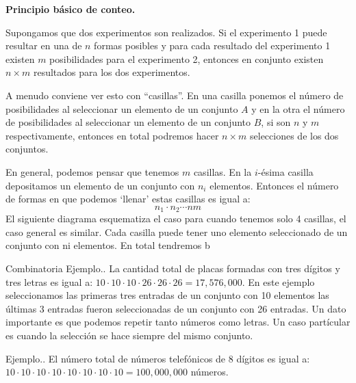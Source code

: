 \documentclass[14pt]{extreport}
\newcounter{ejemplo}[chapter]
\begin{document}
\textbf{Principio básico de conteo.}

Supongamos que dos experimentos son realizados. Si el experimento 1 puede resultar en una de $n$ formas posibles y para cada resultado del experimento 1 existen $m$ posibilidades para el experimento 2, entonces en conjunto existen $n\times m$ resultados para los dos experimentos.


A menudo conviene ver esto con ``casillas''. En una casilla ponemos el número de posibilidades al seleccionar un elemento de un conjunto $A$ y en la otra el número de posibilidades al seleccionar un elemento de un conjunto $B$, si son $n$ y $m$ respectivamente, entonces en total podremos hacer $n\times m$ selecciones de los dos conjuntos.

\begin{center}

\end{center}

En general, podemos pensar que tenemos $m$ casillas. En la $i$-ésima casilla depositamos un elemento de un conjunto con $n_i$ elementos. Entonces el número de formas en que podemos `llenar' estas casillas es igual a:
$$
  n_1\cdot n_2 \cdots nm
$$
El siguiente diagrama esquematiza el caso para cuando tenemos solo 4 casillas, el caso general es similar. Cada casilla puede tener uno elemento seleccionado de un conjunto con ni elementos. En total tendremos b

Combinatoria Ejemplo.. La cantidad total de placas formadas con tres dígitos y tres letras es igual a: $10 \cdot 10 \cdot 10 \cdot 26 \cdot 26 \cdot 26 = 17,576,000$. En este ejemplo seleccionamos las primeras tres entradas de un conjunto con 10 elementos las últimas 3 entradas fueron seleccionadas de un conjunto con 26 entradas. Un dato importante es que podemos repetir tanto números como letras. Un caso partícular es cuando la selección se hace siempre del mismo conjunto.

Ejemplo.. El número total de números telefónicos de 8 dígitos es igual a: $10 \cdot 10 \cdot 10 \cdot 10 \cdot 10 \cdot 10 \cdot 10 \cdot 10 = 100, 000, 000$ números.
\end{document}
